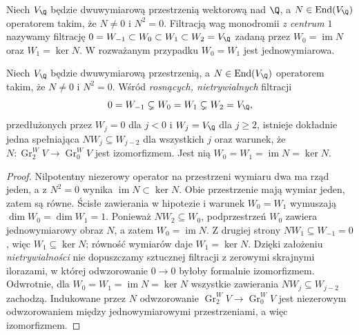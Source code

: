 \begin{definicja}[Filtracja monodromiczna w przypadku $N^2=0$]
Niech $V_\Q$ będzie dwuwymiarową przestrzenią
wektorową nad $\Q$, a $N\in\operatorname{End}(V_\Q)$
operatorem takim, że $N\ne0$ i $N^2=0$.
Filtracją wag monodromii \emph{z centrum $1$} nazywamy
filtrację $0=W_{-1}\subset W_0\subset W_1\subset W_2=V_\Q$
zadaną przez $W_0=\operatorname{im}N$ oraz
$W_1=\ker N$. W rozważanym przypadku
$W_0=W_1$ jest jednowymiarowa.
\end{definicja}
\begin{lemat}
\label{lem:xv-weights-rank2}
Niech $V_\Q$ będzie dwuwymiarową przestrzenią,
a $N\in\operatorname{End}(V_\Q)$ operatorem
takim, że $N\ne0$ i $N^2=0$.
Wśród \emph{rosnących, nietrywialnych} filtracji
\[
 0=W_{-1}\subsetneq W_0=W_1
 \subsetneq W_2=V_\Q,
\]
przedłużonych przez $W_j=0$ dla $j<0$
i $W_j=V_\Q$ dla $j\ge2$,
istnieje dokładnie jedna spełniająca
$NW_j\subseteq W_{j-2}$ dla wszystkich $j$
oraz warunek, że
$N:\operatorname{Gr}_2^WV\to\operatorname{Gr}_0^WV$
jest izomorfizmem. Jest nią
$W_0=W_1=\operatorname{im}N=\ker N$.
\end{lemat}
\begin{proof}
Nilpotentny niezerowy operator na przestrzeni
wymiaru dwa ma rząd jeden, a z $N^2=0$ wynika
$\operatorname{im}N\subset\ker N$. Obie przestrzenie
mają wymiar jeden, zatem są równe.
Ścisłe zawierania w hipotezie i warunek
$W_0=W_1$ wymuszają $\dim W_0=\dim W_1=1$.
Ponieważ $NW_2\subseteq W_0$, podprzestrzeń
$W_0$ zawiera jednowymiarowy obraz $N$,
a zatem $W_0=\operatorname{im}N$.
Z drugiej strony $NW_1\subseteq W_{-1}=0$,
więc $W_1\subseteq\ker N$; równość wymiarów
daje $W_1=\ker N$.
Dzięki założeniu \emph{nietrywialności} nie
dopuszczamy sztucznej filtracji z zerowymi
skrajnymi ilorazami, w której odwzorowanie
$0\to0$ byłoby formalnie izomorfizmem.
Odwrotnie, dla $W_0=W_1=\operatorname{im}N=\ker N$
wszystkie zawierania $NW_j\subseteq W_{j-2}$ zachodzą.
Indukowane przez $N$ odwzorowanie
$\operatorname{Gr}_2^WV\to\operatorname{Gr}_0^WV$
jest niezerowym odwzorowaniem między
jednowymiarowymi przestrzeniami, a więc izomorfizmem.
\end{proof}

